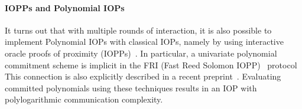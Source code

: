 




\paragraph{IOPPs and Polynomial IOPs} It turns out that with multiple rounds of interaction, it is also possible to implement Polynomial IOPs with classical IOPs, namely by using interactive oracle proofs of proximity (IOPPs)~\cite{STOC:ReiRotRot16,TCC:BenChiSpo16}. In particular, a univariate polynomial commitment scheme is implicit in the FRI (Fast Reed Solomon IOPP)~\cite{ICALP:BBHR18} protocol 
This connection is also explicitly described in a recent preprint~\cite{MatterLabs}. Evaluating committed polynomials using these techniques results in an IOP with polylogarithmic communication complexity.\\

